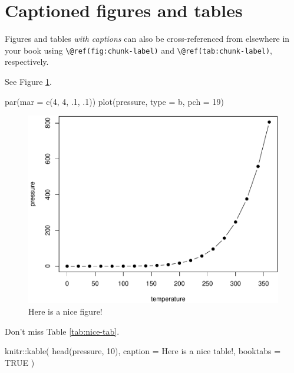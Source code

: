\documentclass[
]{book}
\newenvironment{Shaded}{\begin{snugshade}}{\end{snugshade}}
\newcommand{\AttributeTok}[1]{\textcolor[rgb]{0.77,0.63,0.00}{#1}}
\newcommand{\ConstantTok}[1]{\textcolor[rgb]{0.00,0.00,0.00}{#1}}
\newcommand{\DecValTok}[1]{\textcolor[rgb]{0.00,0.00,0.81}{#1}}
\newcommand{\FunctionTok}[1]{\textcolor[rgb]{0.00,0.00,0.00}{#1}}
\newcommand{\NormalTok}[1]{#1}
\newcommand{\SpecialCharTok}[1]{\textcolor[rgb]{0.00,0.00,0.00}{#1}}
\newcommand{\StringTok}[1]{\textcolor[rgb]{0.31,0.60,0.02}{#1}}
\theoremstyle{definition}
\theoremstyle{definition}
\theoremstyle{definition}
\theoremstyle{definition}
\theoremstyle{remark}
\begin{document}
\hypertarget{captioned-figures-and-tables}{%
\section{Captioned figures and tables}\label{captioned-figures-and-tables}}

Figures and tables \emph{with captions} can also be cross-referenced from elsewhere in your book using \texttt{\textbackslash{}@ref(fig:chunk-label)} and \texttt{\textbackslash{}@ref(tab:chunk-label)}, respectively.

See Figure \ref{fig:nice-fig}.

\begin{Shaded}
\begin{Highlighting}[]
\FunctionTok{par}\NormalTok{(}\AttributeTok{mar =} \FunctionTok{c}\NormalTok{(}\DecValTok{4}\NormalTok{, }\DecValTok{4}\NormalTok{, .}\DecValTok{1}\NormalTok{, .}\DecValTok{1}\NormalTok{))}
\FunctionTok{plot}\NormalTok{(pressure, }\AttributeTok{type =} \StringTok{\textquotesingle{}b\textquotesingle{}}\NormalTok{, }\AttributeTok{pch =} \DecValTok{19}\NormalTok{)}
\end{Highlighting}
\end{Shaded}

\begin{figure}

{\centering \includegraphics[width=0.8\linewidth]{_main_files/figure-latex/nice-fig-1} 

}

\caption{Here is a nice figure!}\label{fig:nice-fig}
\end{figure}

Don't miss Table \ref{tab:nice-tab}.

\begin{Shaded}
\begin{Highlighting}[]
\NormalTok{knitr}\SpecialCharTok{::}\FunctionTok{kable}\NormalTok{(}
  \FunctionTok{head}\NormalTok{(pressure, }\DecValTok{10}\NormalTok{), }\AttributeTok{caption =} \StringTok{\textquotesingle{}Here is a nice table!\textquotesingle{}}\NormalTok{,}
  \AttributeTok{booktabs =} \ConstantTok{TRUE}
\NormalTok{)}
\end{Highlighting}
\end{Shaded}
\end{document}

